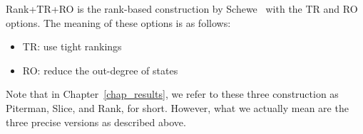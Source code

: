 Rank+TR+RO is the rank-based construction by Schewe~\cite{schewe2009buchi} with the TR and RO options. The meaning of these options is as follows:
\begin{itemize}
\item TR: use tight rankings
\item RO: reduce the out-degree of states
\end{itemize}

Note that in Chapter~\ref{chap_results}, we refer to these three construction as Piterman, Slice, and Rank, for short. However, what we actually mean are the three precise versions as described above.





